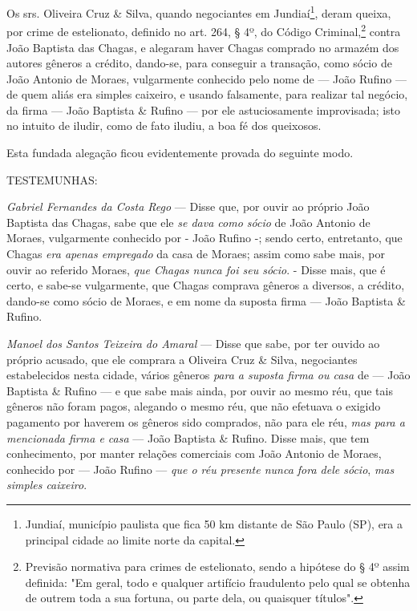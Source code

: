 \asterisc

Os srs. Oliveira Cruz \& Silva, quando negociantes em Jundiaí\footnote{
  Jundiaí, município paulista que fica 50 km distante de São Paulo (SP),
  era a principal cidade ao limite norte da capital.}, deram queixa, por
crime de estelionato, definido no art. 264, § 4º, do Código
Criminal,\footnote{Previsão normativa para crimes de estelionato,
  sendo a hipótese do § 4º assim definida: "Em geral, todo e qualquer
  artifício fraudulento pelo qual se obtenha de outrem toda a sua
  fortuna, ou parte dela, ou quaisquer títulos".} contra João Baptista
das Chagas, e alegaram haver Chagas comprado no armazém dos autores
gêneros a crédito, dando-se, para conseguir a transação, como sócio de
João Antonio de Moraes, vulgarmente conhecido pelo nome de --- João
Rufino --- de quem aliás era simples caixeiro, e usando falsamente,
para realizar tal negócio, da firma --- João Baptista \& Rufino ---
por ele astuciosamente improvisada; isto no intuito de iludir, como de
fato iludiu, a boa fé dos queixosos.

Esta fundada alegação ficou evidentemente provada do seguinte modo.

TESTEMUNHAS:

\emph{Gabriel Fernandes da Costa Rego} --- Disse que, por ouvir ao
próprio João Baptista das Chagas, sabe que ele \emph{se dava como sócio}
de João Antonio de Moraes, vulgarmente conhecido por - João Rufino -;
sendo certo, entretanto, que Chagas \emph{era apenas empregado} da casa
de Moraes; assim como sabe mais, por ouvir ao referido Moraes, \emph{que
Chagas nunca foi seu sócio}. - Disse mais, que é certo, e sabe-se
vulgarmente, que Chagas comprava gêneros a diversos, a crédito, dando-se
como sócio de Moraes, e em nome da suposta firma --- João Baptista \&
Rufino.

\emph{Manoel dos Santos Teixeira do Amaral} --- Disse que sabe, por ter
ouvido ao próprio acusado, que ele comprara a Oliveira Cruz \& Silva,
negociantes estabelecidos nesta cidade, vários gêneros \emph{para a
suposta firma ou casa} de --- João Baptista \& Rufino --- e que sabe
mais ainda, por ouvir ao mesmo réu, que tais gêneros não foram pagos,
alegando o mesmo réu, que não efetuava o exigido pagamento por haverem
os gêneros sido comprados, não para ele réu, \emph{mas para a mencionada
firma e casa} --- João Baptista \& Rufino. Disse mais, que tem
conhecimento, por manter relações comerciais com João Antonio de Moraes,
conhecido por --- João Rufino --- \emph{que o réu presente nunca fora
dele sócio}, \emph{mas simples caixeiro}.

